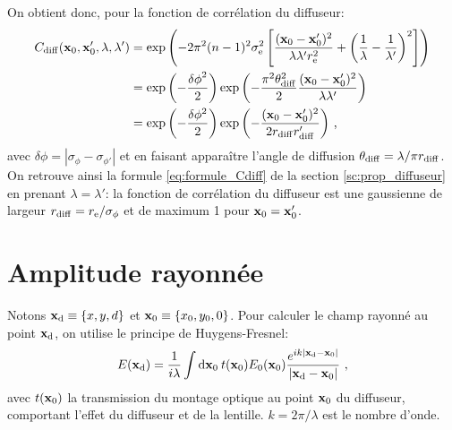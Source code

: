 On obtient donc, pour la fonction de corrélation du diffuseur:
\begin{align}
C_{\mathrm{diff}}(\mathbf{x}_0,\mathbf{x}_0',\lambda,\lambda') &= \exp{\left( -2 \pi^2 (n-1)^2 \sigma_{\mathrm{e}}^2 \left[ \frac{(\mathbf{x}_0- \mathbf{x}_0')^2}{\lambda \lambda' r_{\mathrm{e}}^2} + \left( \frac{1}{\lambda} - \frac{1}{\lambda'} \right)^2 \right] \right)} \\
&= \exp{\left(-\frac{{\delta\phi}^2}{2}\right)} \exp{\left(-\frac{\pi^2 \theta_{\mathrm{diff}}^2}{2} \frac{(\mathbf{x}_0-\mathbf{x}_0')^2}{\lambda \lambda'}\right)} \\
&= \exp{\left( -\frac{\delta\phi^2}{2} \right)} \exp{\left( -\frac{(\mathbf{x}_0-\mathbf{x}_0')^2}{2r_{\mathrm{diff}}r_{\mathrm{diff}}'}\right)} \text{ ,}
\end{align}
avec $\delta\phi=|\sigma_{\phi} - \sigma_{\phi'}|$ et en faisant apparaître l'angle de diffusion $\theta_{\mathrm{diff}}=\lambda /\pi r_{\mathrm{diff}}$. On retrouve ainsi la formule \ref{eq:formule_Cdiff} de la section \ref{sc:prop_diffuseur} en prenant $\lambda=\lambda'$: la fonction de corrélation du diffuseur est une gaussienne de largeur $r_{\mathrm{diff}}=r_{\mathrm{e}}/\sigma_{\phi}$ et de maximum 1 pour $\mathbf{x}_0=\mathbf{x}_0'$.




\section{Amplitude rayonnée}
Notons $\mathbf{x}_{\mathrm{d}} \equiv \left\lbrace x,y,d \right\rbrace$ et $\mathbf{x}_0 \equiv \left\lbrace x_0,y_0,0 \right\rbrace$. Pour calculer le champ rayonné au point $\mathbf{x}_{\mathrm{d}}$, on utilise le principe de Huygens-Fresnel:
\begin{equation}
E(\mathbf{x}_{\mathrm{d}})=\frac{1}{i \lambda} \int {\mathop{}\mathopen{}\mathrm{d}\mathbf{x}_0\: t(\mathbf{x}_0) E_0(\mathbf{x}_0) \frac{e^{ik \left| \mathbf{x}_{\mathrm{d}}-\mathbf{x}_0\right| }}{\left| \mathbf{x}_{\mathrm{d}}- \mathbf{x}_0\right| }} \text{ ,}
\label{eq:Huygens-Fresnel}
\end{equation}
avec $t(\mathbf{x}_0)$ la transmission du montage optique au point $\mathbf{x}_0$ du diffuseur, comportant l'effet du diffuseur et de la lentille. $k=2\pi /\lambda$ est le nombre d'onde.

